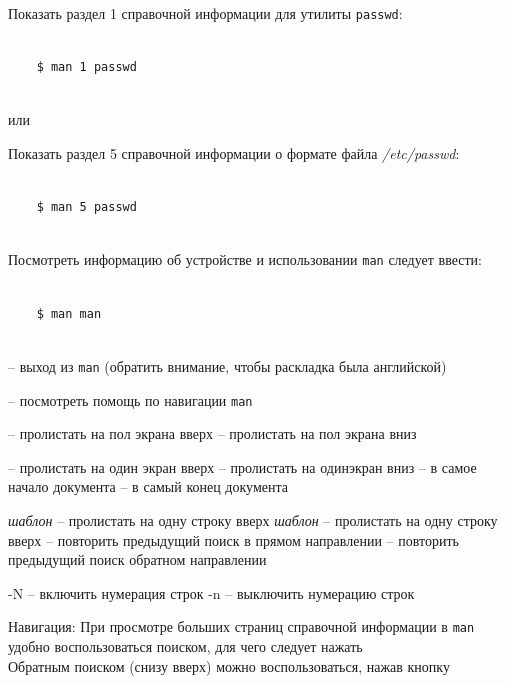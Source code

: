 Показать раздел 1 справочной информации для утилиты \texttt{passwd}:
\begin{lstlisting}
	
	$ man 1 passwd
	
\end{lstlisting}	
или

Показать раздел 5 справочной информации о формате файла \textit{/etc/passwd}:

\begin{lstlisting}
	
	$ man 5 passwd
	
\end{lstlisting}	


Посмотреть информацию об устройстве и использовании \texttt{man} следует ввести:

\begin{lstlisting}
	
	$ man man
	
\end{lstlisting}	

 -- выход из \texttt{man} (обратить внимание, чтобы раскладка была английской)

 -- посмотреть помощь по навигации \texttt{man}

 -- пролистать на пол экрана вверх
 -- пролистать на пол экрана вниз

 -- пролистать на один экран вверх
 -- пролистать на одинэкран вниз
 -- в самое начало документа
 -- в самый конец документа



\keystroke{ / } \textit{шаблон} -- пролистать на одну строку вверх
 \textit{шаблон} -- пролистать на одну строку вверх
 -- повторить предыдущий поиск в прямом направлении
 -- повторить предыдущий поиск обратном направлении

-N	-- включить нумерация строк
-n	-- выключить нумерацию строк

Навигация:
При просмотре больших страниц справочной информации в \texttt{man} удобно воспользоваться поиском, для чего следует нажать \keystroke{ / } \\
Обратным поиском (снизу вверх) можно воспользоваться, нажав кнопку 

